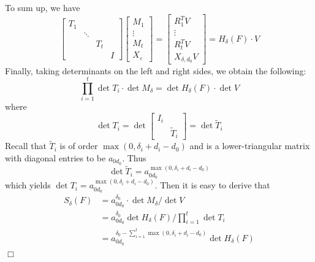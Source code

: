 \documentclass{article}
\newenvironment{proof}{\noindent{\em Proof:}}{$\Box$~\\}
\begin{document}
\begin{proof}
To sum up, we have
$$\begin{bmatrix}
T_1&&&\\
&\ddots&&\\
&&T_t&\\
&&&I
\end{bmatrix}\begin{bmatrix}
M_1\\\vdots\\[3pt]M_t\\[3pt]X_{\varepsilon}
\end{bmatrix}=\begin{bmatrix}
R_1^TV\\\vdots\\[3pt]R_t^T V\\[3pt]X_{\delta ,{d_0}} V
\end{bmatrix}=H_\delta (F) \cdot V
$$
Finally, taking determinants on the left and right sides, we obtain the following:
\[
\prod_{i=1}^t\det T_i\cdot\det M_{\delta}=\det H_\delta (F) \cdot \det V\]
where
\[
\det T_i=\det \begin{bmatrix}
I_i&\\
&\tilde{T}_i\end{bmatrix}=\det \tilde{T}_i
\]
Recall that $\tilde{T}_i$ is of order $\max(0,\delta_i+d_i-d_0)$ and is a lower-triangular matrix with diagonal entries to be $a_{0d_0}$. Thus
\[\det \tilde{T}_i=a_{0d_0}^{\max(0,\delta_i+d_i-d_0)}\]
which yields $\det T_i=a_{0d_0}^{\max(0,\delta_i+d_i-d_0)}$.
Then it is easy to derive that
\begin{align*}
S_{\delta}(F)&=a_{0d_0}^{\delta_0}\cdot\det M_{\delta}/\det V\\
&=a_{0d_0}^{\delta_0}\det H_\delta (F) \bigg/ {\prod_{i=1}^t\det T_i}
\\
&=a_{0d_0}^{\delta_0-\sum_{i=1}^t\max(0,\delta_i+d_i-d_0)}\det H_\delta (F)
\end{align*}
\end{proof}
\end{document}
